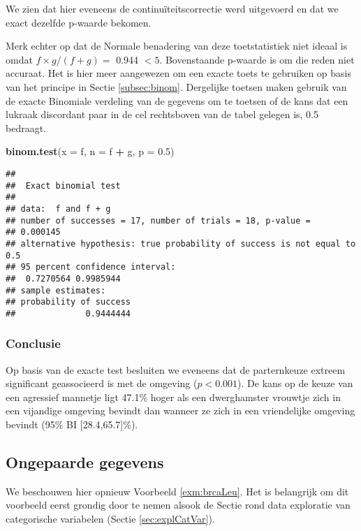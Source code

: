 \documentclass[12pt,dutch,coursenotes]{book}
\newenvironment{Shaded}{\begin{snugshade}}{\end{snugshade}}
\newcommand{\KeywordTok}[1]{\textcolor[rgb]{0.13,0.29,0.53}{\textbf{#1}}}
\newcommand{\DataTypeTok}[1]{\textcolor[rgb]{0.13,0.29,0.53}{#1}}
\newcommand{\FloatTok}[1]{\textcolor[rgb]{0.00,0.00,0.81}{#1}}
\newcommand{\StringTok}[1]{\textcolor[rgb]{0.31,0.60,0.02}{#1}}
\newcommand{\OperatorTok}[1]{\textcolor[rgb]{0.81,0.36,0.00}{\textbf{#1}}}
\newcommand{\NormalTok}[1]{#1}
\theoremstyle{definition}
\theoremstyle{definition}
\theoremstyle{definition}
\theoremstyle{remark}
\begin{document}
We zien dat hier eveneens de continuïteitscorrectie werd uitgevoerd en
dat we exact dezelfde p-waarde bekomen.

Merk echter op dat de Normale benadering van deze toetstatistiek niet
ideaal is omdat \(f \times g/(f+g)=\) 0.944 \(<5\). Bovenstaande
p-waarde is om die reden niet accuraat. Het is hier meer aangewezen om
een exacte toets te gebruiken op basis van het principe in Sectie
\ref{subsec:binom}. Dergelijke toetsen maken gebruik van de exacte
Binomiale verdeling van de gegevens om te toetsen of de kans dat een
lukraak discordant paar in de cel rechtsboven van de tabel gelegen is,
0.5 bedraagt.

\begin{Shaded}
\begin{Highlighting}[]
\KeywordTok{binom.test}\NormalTok{(}\DataTypeTok{x =}\NormalTok{ f, }\DataTypeTok{n =}\NormalTok{ f }\OperatorTok{+}\StringTok{ }\NormalTok{g, }\DataTypeTok{p =} \FloatTok{0.5}\NormalTok{)}
\end{Highlighting}
\end{Shaded}

\begin{verbatim}
## 
##  Exact binomial test
## 
## data:  f and f + g
## number of successes = 17, number of trials = 18, p-value =
## 0.000145
## alternative hypothesis: true probability of success is not equal to 0.5
## 95 percent confidence interval:
##  0.7270564 0.9985944
## sample estimates:
## probability of success 
##              0.9444444
\end{verbatim}

\subsubsection{Conclusie}\label{conclusie-1}

Op basis van de exacte test besluiten we eveneens dat de parternkeuze
extreem significant geassocieerd is met de omgeving (\(p<0.001\)). De
kans op de keuze van een agressief mannetje ligt 47.1\% hoger als een
dwerghamster vrouwtje zich in een vijandige omgeving bevindt dan wanneer
ze zich in een vriendelijke omgeving bevindt (95\% BI
{[}28.4,65.7{]}\%).

\subsection{Ongepaarde gegevens}\label{subsec:catOnPaired}

We beschouwen hier opnieuw Voorbeeld \ref{exm:brcaLeu}. Het is
belangrijk om dit voorbeeld eerst grondig door te nemen alsook de Sectie
rond data exploratie van categorische variabelen (Sectie
\ref{sec:explCatVar}).
\end{document}
